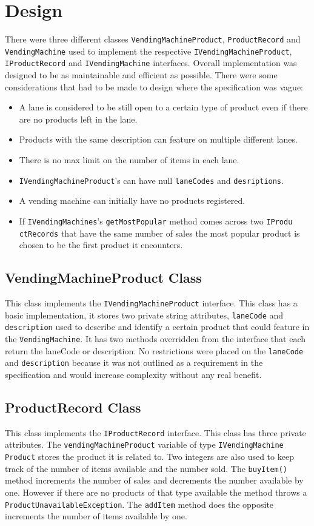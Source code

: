 \documentclass{article}
\begin{document}
\section{Design}
There were three different classes \verb+VendingMachineProduct+, \verb+ProductRecord+ and \verb+VendingMachine+ used to implement the respective \verb+IVendingMachineProduct+, \verb+IProductRecord+ and \verb+IVendingMachine+ interfaces. Overall implementation was designed to be as maintainable and efficient as possible. There were some considerations that had to be made to design where the specification was vague:
\begin{itemize}
	\item A lane is considered to be still open to a certain type of product even if there are no products left in the lane.
	\item Products with the same description can feature on multiple different lanes.
	\item There is no max limit on the number of items in each lane.
	\item \verb+IVendingMachineProduct+'s can have null \verb+laneCodes+ and \verb+desriptions+.
	\item A vending machine can initially have no products registered.
	\item If \verb+IVendingMachines+'s \verb+getMostPopular+ method comes across two \verb+IProdu+ \verb+ctRecords+ that have the same number of sales the most popular product is chosen to be the first product it encounters.
	
\end{itemize}
\subsection{VendingMachineProduct Class}
This class implements the \verb+IVendingMachineProduct+ interface. This class has a basic implementation, it stores two private string attributes, \verb+laneCode+ and \verb+description+ used to describe and identify a certain product that could feature in the \verb+VendingMachine+. It has two methods overridden from the interface that each return the laneCode or description. No restrictions were placed on the \verb+laneCode+ and \verb+description+ because it was not outlined as a requirement in the specification and would increase complexity without any real benefit.
\subsection{ProductRecord Class}
This class implements the \verb+IProductRecord+ interface. This class has three private attributes. The \verb+vendingMachineProduct+ variable of type \verb+IVendingMachine+ \verb+Product+ stores the product it is related to. Two integers are also used to keep track of the number of items available and the number sold. The \verb+buyItem()+ method increments the number of sales and decrements the number available by one. However if there are no products of that type available the method throws a \verb+ProductUnavailableException+. The \verb+addItem+ method does the opposite increments the number of items available by one.
\end{document}
